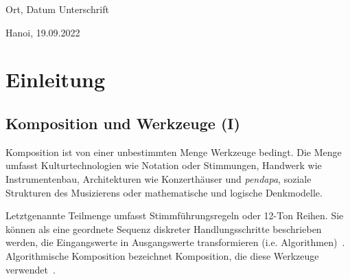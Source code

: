 \documentclass[12pt,a4paper,ngerman]{article}
\begin{document}
\vspace{4cm}

\hspace{2cm} Ort, Datum \hfill Unterschrift \hspace{2cm}

\vspace{0.2cm}

\hspace{2cm} Hanoi, 19.09.2022



\newpage

{
    \tableofcontents
}


\newpage


\newpage

\listoffigures
\listoftables


\newpage
{}

\section{Einleitung}

\subsection{Komposition und Werkzeuge (I)}

\noindent
Komposition ist von einer unbestimmten Menge Werkzeuge bedingt.
Die Menge umfasst Kulturtechnologien wie Notation oder Stimmungen, Handwerk wie Instrumentenbau, Architekturen wie Konzerthäuser und \emph{pendapa}, soziale Strukturen des Musizierens oder mathematische und logische Denkmodelle.

\bigskip

\noindent
Letztgenannte Teilmenge umfasst Stimmführungsregeln oder 12-Ton Reihen.
Sie können als eine geordnete Sequenz diskreter Handlungsschritte beschrieben werden, die Eingangswerte in Ausgangswerte transformieren (i.e. Algorithmen)~\parencite[S. 3]{introductionToAlgorithms}.
Algorithmische Komposition bezeichnet Komposition, die diese Werkzeuge verwendet~\parencite[S. 1]{algorithmicCompositionParadigms}.
\end{document}
